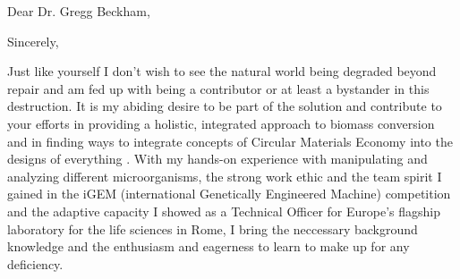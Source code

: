 \documentclass[11pt,a4paper,sans]{moderncv}
\begin{document}
\date{\today}
\opening{Dear Dr. Gregg Beckham,}
\closing{Sincerely,}
\makelettertitle
\begin{spacing}{1.15}

Just like yourself I don't wish to see the natural world being degraded beyond repair and am fed up with being a contributor or at least a bystander in this destruction. 
It is my abiding desire to be part of the solution and contribute to your efforts in providing a holistic, integrated approach to biomass conversion and in finding ways to integrate concepts of Circular Materials Economy into the designs of everything . 
With my hands-on experience with manipulating and analyzing different microorganisms, the strong work ethic and the team spirit I gained in the iGEM (international Genetically Engineered Machine) competition and the adaptive capacity I showed as a Technical Officer for Europe's flagship laboratory for the life sciences in Rome, I bring the neccessary background knowledge and the enthusiasm and eagerness to learn to make up for any deficiency.\par\vspace*{1mm}


\end{spacing}
\end{document}
